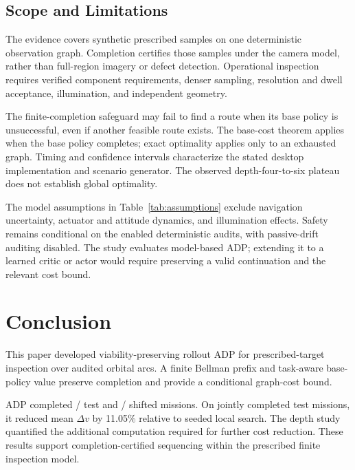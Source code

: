 \subsection{Scope and Limitations}

The evidence covers synthetic prescribed samples on one deterministic observation graph. Completion certifies those samples under the camera model, rather than full-region imagery or defect detection. Operational inspection requires verified component requirements, denser sampling, resolution and dwell acceptance, illumination, and independent geometry.

The finite-completion safeguard may fail to find a route when its base policy is unsuccessful, even if another feasible route exists. The base-cost theorem applies when the base policy completes; exact optimality applies only to an exhausted graph. Timing and confidence intervals characterize the stated desktop implementation and scenario generator. The observed depth-four-to-six plateau does not establish global optimality.

The model assumptions in Table~\ref{tab:assumptions} exclude navigation uncertainty, actuator and attitude dynamics, and illumination effects. Safety remains conditional on the enabled deterministic audits, with passive-drift auditing disabled. The study evaluates model-based ADP; extending it to a learned critic or actor would require preserving a valid continuation and the relevant cost bound.

\section{Conclusion}
\label{sec:conclusion}

This paper developed viability-preserving rollout ADP for prescribed-target inspection over audited orbital arcs. A finite Bellman prefix and task-aware base-policy value preserve completion and provide a conditional graph-cost bound.

ADP completed \RTTestSuccess/\RTTestN{} test and \RTOodSuccess/\RTOodN{} shifted missions. On jointly completed test missions, it reduced mean $\Delta v$ by 11.05\% relative to seeded local search. The depth study quantified the additional computation required for further cost reduction. These results support completion-certified sequencing within the prescribed finite inspection model.


